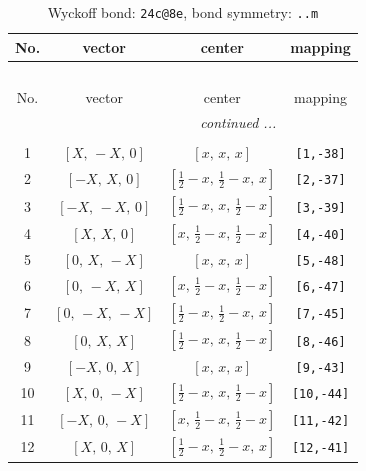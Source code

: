\documentclass[fleqn,8pt]{jsarticle}
\begin{document}
\begin{longtable}{cccc}
\caption{Wyckoff bond: {\tt 24c@8e}, bond symmetry: {\tt ..m}}
 \\
 \hline \hline
No. & vector & center & mapping \\ \hline \endfirsthead

\multicolumn{3}{l}{\tablename\ \thetable{}} \\
 \hline \hline
No. & vector & center & mapping \\ \hline \endhead

 \hline \hline
\multicolumn{3}{r}{\footnotesize\it continued ...} \\ \endfoot

 \hline \hline
\multicolumn{3}{r}{} \\ \endlastfoot

1 & $\left[ X,\, - X,\, 0 \right]$ & $\left[ x,\, x,\, x \right]$ & {\tt [1,-38]} \\ \hline
2 & $\left[ - X,\, X,\, 0 \right]$ & $\left[ \frac{1}{2} - x,\, \frac{1}{2} - x,\, x \right]$ & {\tt [2,-37]} \\ \hline
3 & $\left[ - X,\, - X,\, 0 \right]$ & $\left[ \frac{1}{2} - x,\, x,\, \frac{1}{2} - x \right]$ & {\tt [3,-39]} \\ \hline
4 & $\left[ X,\, X,\, 0 \right]$ & $\left[ x,\, \frac{1}{2} - x,\, \frac{1}{2} - x \right]$ & {\tt [4,-40]} \\ \hline
5 & $\left[ 0,\, X,\, - X \right]$ & $\left[ x,\, x,\, x \right]$ & {\tt [5,-48]} \\ \hline
6 & $\left[ 0,\, - X,\, X \right]$ & $\left[ x,\, \frac{1}{2} - x,\, \frac{1}{2} - x \right]$ & {\tt [6,-47]} \\ \hline
7 & $\left[ 0,\, - X,\, - X \right]$ & $\left[ \frac{1}{2} - x,\, \frac{1}{2} - x,\, x \right]$ & {\tt [7,-45]} \\ \hline
8 & $\left[ 0,\, X,\, X \right]$ & $\left[ \frac{1}{2} - x,\, x,\, \frac{1}{2} - x \right]$ & {\tt [8,-46]} \\ \hline
9 & $\left[ - X,\, 0,\, X \right]$ & $\left[ x,\, x,\, x \right]$ & {\tt [9,-43]} \\ \hline
10 & $\left[ X,\, 0,\, - X \right]$ & $\left[ \frac{1}{2} - x,\, x,\, \frac{1}{2} - x \right]$ & {\tt [10,-44]} \\ \hline
11 & $\left[ - X,\, 0,\, - X \right]$ & $\left[ x,\, \frac{1}{2} - x,\, \frac{1}{2} - x \right]$ & {\tt [11,-42]} \\ \hline
12 & $\left[ X,\, 0,\, X \right]$ & $\left[ \frac{1}{2} - x,\, \frac{1}{2} - x,\, x \right]$ & {\tt [12,-41]} \\ \hline

\end{longtable}
\end{document}
